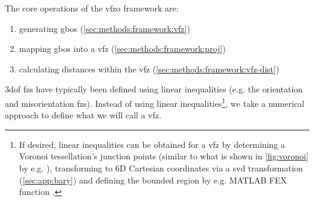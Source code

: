 \documentclass[final,twocolumn,12pt]{elsarticle}
\begin{document}
The core operations of the \gls{vfzo} framework are:
\begin{enumerate}
    \item generating \glspl{gbo} (\cref{sec:methods:framework:vfz})
    \item mapping \glspl{gbo} into a \gls{vfz} (\cref{sec:methods:framework:proj})
    \item calculating distances within the \gls{vfz} (\cref{sec:methods:framework:vfz-dist})
\end{enumerate}
\Gls{3dof} \glspl{fz} have typically been defined using linear inequalities (e.g. the orientation \cite{heinzRepresentationOrientationDisorientation1991} and misorientation \cite{grimmerUniqueDescriptionRelative1980,heinzRepresentationOrientationDisorientation1991} \glspl{fz}). Instead of using linear inequalities\footnote{If desired, linear inequalities can be obtained for a \gls{vfz} by determining a Voronoi tessellation's junction points (similar to what is shown in \cref{fig:voronoi} by e.g. ), transforming to 6D Cartesian coordinates via a \gls{svd} transformation (\cref{sec:app:bary}) and defining the bounded region by e.g. MATLAB FEX function .}, we take a numerical approach to define what we will call a \gls{vfz}. %
\end{document}

